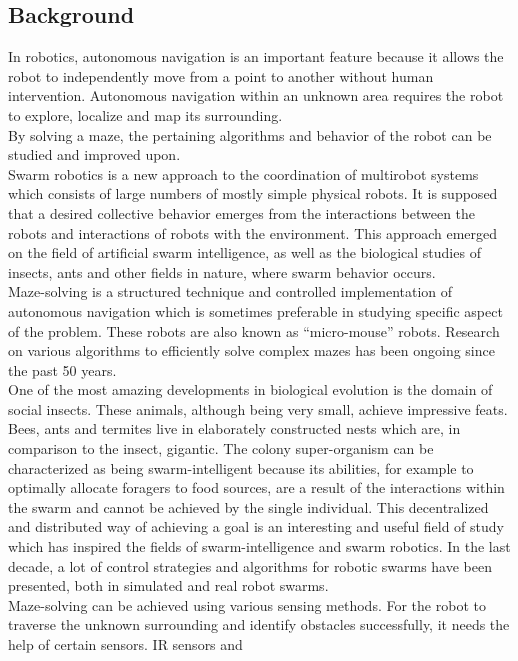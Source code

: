 \subsection{Background}
In robotics, autonomous navigation is an important feature because it allows the robot to independently
move from a point to another without human intervention. Autonomous navigation within an unknown
area requires the robot to explore, localize and map its surrounding.\\
By solving a maze, the pertaining algorithms and behavior of the robot can be studied and
improved upon.\\
Swarm robotics is a new approach to the coordination of multirobot systems which consists
of large numbers of mostly simple physical robots. It is supposed that a desired collective
behavior emerges from the interactions between the robots and interactions of robots with
the environment. This approach emerged on the field of artificial swarm intelligence, as well
as the biological studies of insects, ants and other fields in nature, where swarm behavior
occurs.\\
Maze-solving is a structured technique and controlled implementation of autonomous navigation which
is sometimes preferable in studying specific aspect of the problem. These
robots are also known as “micro-mouse” robots. Research on various algorithms to efficiently
solve complex mazes has been ongoing since the past 50 years.\\
One of the most amazing developments in biological evolution is the domain of social insects. These
animals, although being very small, achieve impressive feats. Bees, ants and
termites live in elaborately constructed nests which are, in comparison to the insect, gigantic. The
colony super-organism can be characterized as being swarm-intelligent because its
abilities, for example to optimally allocate foragers to food sources, are a result of the interactions
within the swarm and cannot be achieved by the single individual. This decentralized
and distributed way of achieving a goal is an interesting and useful field of study which has
inspired the fields of swarm-intelligence and swarm robotics. In the last decade, a lot of
control strategies and algorithms for robotic swarms have been presented, both in simulated
and real robot swarms.\\
Maze-solving can be achieved using various sensing methods. For the robot to traverse the unknown
surrounding and identify obstacles successfully, it needs the help of certain sensors. IR sensors and
